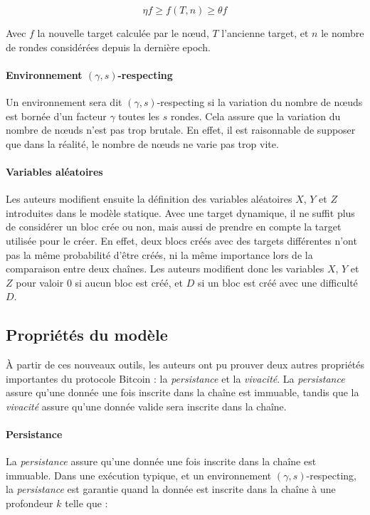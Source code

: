     \begin{equation}
        \eta f \geq f(T, n) \geq \theta f
    \end{equation}

    Avec $f$ la nouvelle target calculée par le nœud, $T$ l'ancienne target,
    et $n$ le nombre de rondes considérées depuis la dernière epoch.

    \paragraph{Environnement $(\gamma, s)$-respecting} Un environnement sera 
    dit $(\gamma, s)$-respecting si la variation du nombre de nœuds est bornée
    d'un facteur $\gamma$ toutes les $s$ rondes. Cela assure que la variation
    du nombre de nœuds n'est pas trop brutale. En effet, il est raisonnable de
    supposer que dans la réalité, le nombre de nœuds ne varie pas trop vite.

    \paragraph{Variables aléatoires} Les auteurs modifient ensuite la définition
    des variables aléatoires $X$, $Y$ et $Z$ introduites dans le modèle
    statique. Avec une target dynamique, il ne suffit plus de considérer un bloc
    crée ou non, mais aussi de prendre en compte la target utilisée pour le
    créer. En effet, deux blocs créés avec des targets différentes n'ont pas la
    même probabilité d'être créés, ni la même importance lors de la comparaison
    entre deux chaînes. Les auteurs modifient donc les variables $X$, $Y$ et $Z$
    pour valoir $0$ si aucun bloc est créé, et $D$ si un bloc est créé avec une
    difficulté $D$.


    \subsection{Propriétés du modèle}\label{subsec:dynamic-resultats}

    À partir de ces nouveaux outils, les auteurs ont pu prouver deux autres
    propriétés importantes du protocole Bitcoin : la \textit{persistance} et la
    \textit{vivacité}. La \textit{persistance} assure qu'une donnée une fois
    inscrite dans la chaîne est immuable, tandis que la \textit{vivacité} assure
    qu'une donnée valide sera inscrite dans la chaîne.

    \paragraph{Persistance} La \textit{persistance} assure qu'une donnée une
    fois inscrite dans la chaîne est immuable. Dans une exécution typique, et un
    environnement $(\gamma, s)$-respecting, la \textit{persistance} est garantie
    quand la donnée est inscrite dans la chaîne à une profondeur $k$ telle que :

